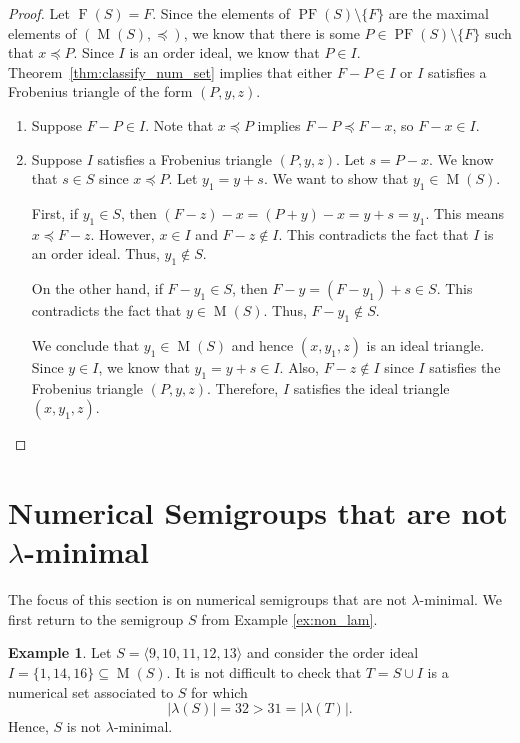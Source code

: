 \documentclass{amsproc}
\DeclareMathOperator{\F}{F}
\DeclareMathOperator{\PF}{PF}
\DeclareMathOperator{\M}{M}
\theoremstyle{definition}
\newtheorem{example}[theorem]{Example}
\theoremstyle{remark}
\numberwithin{equation}{section}
\begin{document}
\begin{proof}
Let $\F(S)=F$. Since the elements of $\PF(S)\setminus\{F\}$ are the maximal elements of $(\M(S),\preccurlyeq)$, we know that there is some $P\in \PF(S)\setminus\{F\}$ such that $x\preccurlyeq P$. Since $I$ is an order ideal, we know that $P\in I$. Theorem~\ref{thm:classify_num_set} implies that either $F-P\in I$ or $I$ satisfies a Frobenius triangle of the form $(P,y,z)$.
\begin{enumerate}[leftmargin=*]
\item Suppose $F-P\in I$. Note that $x\preccurlyeq P$ implies $F-P\preccurlyeq F-x$, so $F-x\in I$.

\item Suppose $I$ satisfies a Frobenius triangle $(P,y,z)$. Let $s=P-x$. We know that $s\in S$ since $x\preccurlyeq P$. Let $y_1=y+s$. We want to show that $y_1\in \M(S)$. 

First, if $y_1\in S$, then $(F-z)-x= (P+y)-x=y+s=y_1$. This means $x\preccurlyeq F-z$. However, $x\in I$ and $F-z\notin I$. This contradicts the fact that $I$ is an order ideal. Thus, $y_1\notin S$. 

On the other hand, if $F-y_1\in S$, then $F-y= (F-y_1)+s\in S$. This contradicts the fact that $y\in \M(S)$. Thus, $F-y_1\notin S$.


We conclude that $y_1\in \M(S)$ and hence $(x,y_1,z)$ is an ideal triangle. Since $y\in I$, we know that $y_1=y+s\in I$. Also, $F-z\notin I$ since $I$ satisfies the Frobenius triangle $(P,y,z)$. Therefore, $I$ satisfies the ideal triangle $(x,y_1,z)$.
\end{enumerate}

\end{proof}


\section{Numerical Semigroups that are not $\lambda$-minimal}\label{sec:non-lam}

The focus of this section is on numerical semigroups that are not $\lambda$-minimal.  We first return to the semigroup $S$ from Example \ref{ex:non_lam}.
\begin{example}\label{ex:non_lam_I}
     Let $S=\langle 9,10,11,12,13\rangle$ and consider the order ideal $I=\{1,14,16\} \subseteq \M(S)$. It is not difficult to check that $T=S\cup I$ is a numerical set associated to $S$ for which 
     \[
     |\lambda(S)|=32 > 31=|\lambda(T)|.
     \] 
     Hence, $S$ is not $\lambda$-minimal.
\end{example}
\end{document}
